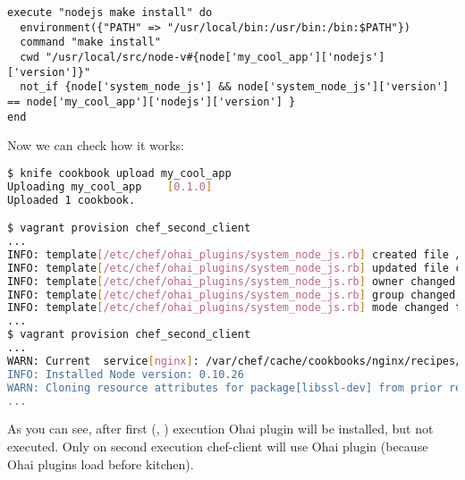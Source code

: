 \begin{lstlisting}[label=lst:cookbook-ohai7]
execute "nodejs make install" do
  environment({"PATH" => "/usr/local/bin:/usr/bin:/bin:$PATH"})
  command "make install"
  cwd "/usr/local/src/node-v#{node['my_cool_app']['nodejs']['version']}"
  not_if {node['system_node_js'] && node['system_node_js']['version'] == node['my_cool_app']['nodejs']['version'] }
end
\end{lstlisting}

Now we can check how it works:

\begin{lstlisting}[language=Bash,label=lst:cookbook-ohai8]
$ knife cookbook upload my_cool_app
Uploading my_cool_app    [0.1.0]
Uploaded 1 cookbook.

$ vagrant provision chef_second_client
...
INFO: template[/etc/chef/ohai_plugins/system_node_js.rb] created file /etc/chef/ohai_plugins/system_node_js.rb
INFO: template[/etc/chef/ohai_plugins/system_node_js.rb] updated file contents /etc/chef/ohai_plugins/system_node_js.rb
INFO: template[/etc/chef/ohai_plugins/system_node_js.rb] owner changed to 0
INFO: template[/etc/chef/ohai_plugins/system_node_js.rb] group changed to 0
INFO: template[/etc/chef/ohai_plugins/system_node_js.rb] mode changed to 755
...
$ vagrant provision chef_second_client
...
WARN: Current  service[nginx]: /var/chef/cache/cookbooks/nginx/recipes/source.rb:123:in `from_file'
INFO: Installed Node version: 0.10.26
WARN: Cloning resource attributes for package[libssl-dev] from prior resource (CHEF-3694)
...
\end{lstlisting}

As you can see, after first  (, ) execution Ohai plugin will be installed, but not executed. Only on second execution chef-client will use Ohai plugin (because Ohai plugins load before kitchen).
